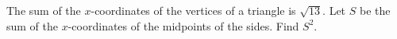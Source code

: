 The sum of the $x$-coordinates of the vertices of a triangle is $\sqrt{13}$. Let $S$ be the sum of the $x$-coordinates of the midpoints of the sides. Find $S^2$.
